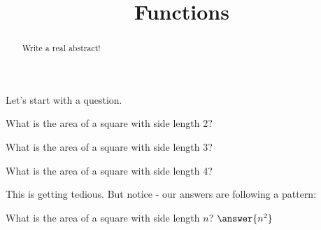 \documentclass{ximera}
\title{Functions}
\begin{document}
\begin{abstract}
Write a real abstract!
\end{abstract}

Let's start with a question.

\begin{question}
What is the area of a square with side length 2? 
\begin{question}
What is the area of a square with side length 3? 
\begin{question}
What is the area of a square with side length 4? 
\end{question}
\end{question}
\end{question}

This is getting tedious. But notice - our answers are following a pattern:

\begin{question}
What is the area of a square with side length $n$? $\answer{n^2}$ 
\end{question}

\end{document}
